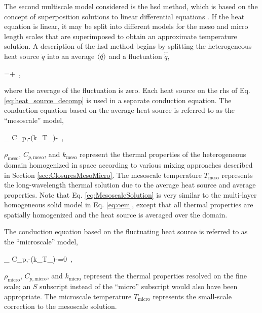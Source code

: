 The second multiscale model considered is the \gls{hsd} method, which is based on the concept of superposition solutions to linear differential equations \cite{stainsby}. If the heat equation is linear, it may be split into different models for the meso and micro length scales that are superimposed to obtain an approximate temperature solution. A description of the \gls{hsd} method begins by splitting the heterogeneous heat source \(\dot{q}\) into an average \(\langle\dot{q}\rangle\) and a fluctuation \(\hat{\dot{q}}\),

\beq
\label{eq:heat_source_decomp}
=\la{}\ra+\ ,
\eeq

\noindent where the average of the fluctuation is zero. Each heat source on the \gls{rhs} of Eq. \eqref{eq:heat_source_decomp} is used in a separate conduction equation. The conduction equation based on the average heat source is referred to as the ``mesoscale'' model,

\beq
\label{eq:MesoscaleSolution}
\rho_ C_{p,}-\nabla\cdot(k_\nabla T_)-\la{}\ ,
\eeq

\noindent \(\rho_\text{meso}\), \(C_{p,\text{meso}}\), and \(k_\text{meso}\) represent the thermal properties of the heterogeneous domain homogenized in space according to various mixing approaches described in Section \ref{sec:ClosuresMesoMicro}. The mesoscale temperature \(T_\text{meso}\) represents the long-wavelength thermal solution due to the average heat source and average properties. Note that Eq. \eqref{eq:MesoscaleSolution} is very similar to the multi-layer homogeneous solid model in Eq. \eqref{eq:oem}, except that all thermal properties are spatially homogenized and the heat source is averaged over the domain.

The conduction equation based on the fluctuating heat source is referred to as the ``microscale'' model,

\beq
\label{eq:MicroscaleSolution}
\rho_ C_{p,}-\nabla\cdot(k_\nabla T_)-=0\ ,
\eeq

\noindent \(\rho_\text{micro}\), \(C_{p,\text{micro}}\), and \(k_\text{micro}\) represent the thermal properties resolved on the fine scale; an \(S\) subscript instead of the ``micro'' subscript would also have been appropriate. The microscale temperature \(T_\text{micro}\) represents the small-scale correction to the mesoscale solution.

